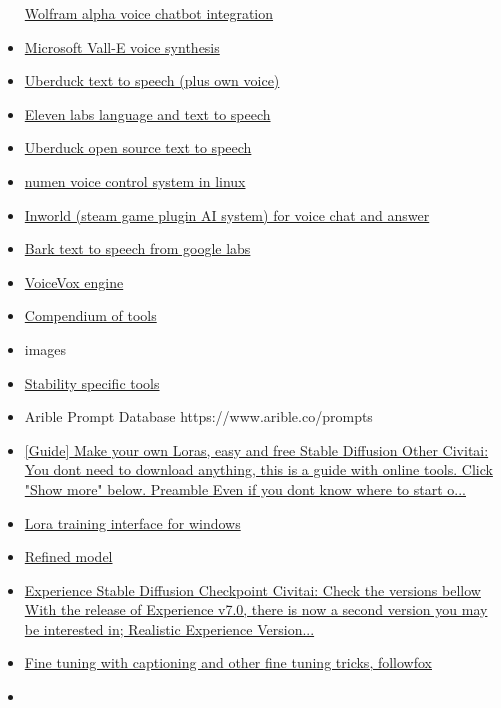\begin{itemize}
  \href{https://huggingface.co/spaces/JavaFXpert/Chat-GPT-LangChain}{Wolfram
  alpha voice chatbot integration}
\item
  \href{https://valle-demo.github.io/}{Microsoft Vall-E voice synthesis}
\item
  \href{https://app.uberduck.ai/}{Uberduck text to speech (plus own
  voice)}
\item
  \href{https://beta.elevenlabs.io/}{Eleven labs language and text to
  speech}
\item
  \href{https://uberduck.ai/}{Uberduck open source text to speech}
\item
  \href{https://numenvoice.com}{numen voice control system in linux}
\item
  \href{https://www.youtube.com/watch?v=DnF4WzM5LPU}{Inworld (steam game
  plugin AI system) for voice chat and answer}
\item
  \href{https://github.com/suno-ai/bark}{Bark text to speech from google
  labs}
\item
  \href{https://www.youtube.com/watch?v=TGZV831VTpc}{VoiceVox engine}
\item
  \href{https://www.futurepedia.io/}{Compendium of tools}
\item
  images
\item
  \href{https://sdtools.org/}{Stability specific tools}
\item
  Arible Prompt Database https://www.arible.co/prompts
\item
  \href{https://civitai.com/models/22530}{{[}Guide{]} Make your own
  Loras, easy and free \textbar{} Stable Diffusion Other \textbar{}
  Civitai: You don\textquotesingle t need to download anything, this is
  a guide with online tools. Click "Show more" below.   Preamble Even if
  you don\textquotesingle t know where to start o...}
\item
  \href{https://github.com/bmaltais/kohya_ss}{Lora training interface
  for windows}
\item
  \href{https://civitai.com/models/8392/refined}{Refined model}
\item
  \href{https://civitai.com/models/5952}{Experience \textbar{} Stable
  Diffusion Checkpoint \textbar{} Civitai: Check the versions bellow
  With the release of Experience v7.0, there is now a second version you
  may be interested in; Realistic Experience Version...}
\item
  \href{https://substack.com/profile/110613456-followfoxai}{Fine tuning
  with captioning and other fine tuning tricks, followfox}
\item

\end{itemize}
